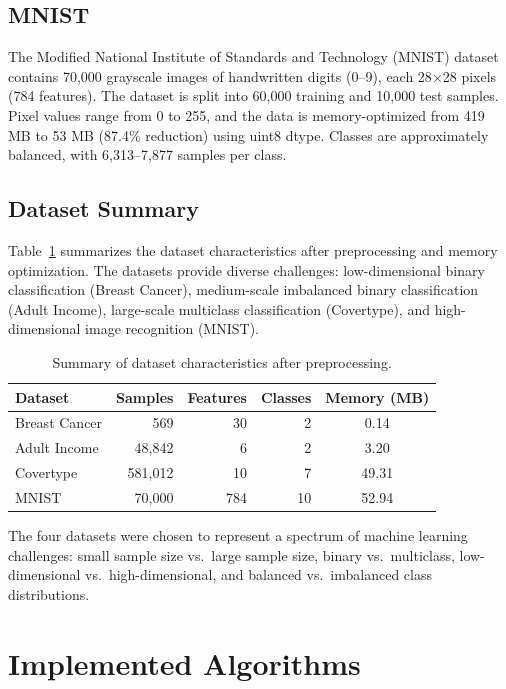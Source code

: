 \documentclass[conference,12pt]{IEEEtran}
\begin{document}
\subsection{MNIST}

The Modified National Institute of Standards and Technology (MNIST) dataset \cite{lecun1998mnist} contains 70,000 grayscale images of handwritten digits (0--9), each 28$\times$28 pixels (784 features). The dataset is split into 60,000 training and 10,000 test samples. Pixel values range from 0 to 255, and the data is memory-optimized from 419 MB to 53 MB (87.4\% reduction) using uint8 dtype. Classes are approximately balanced, with 6,313--7,877 samples per class.

\subsection{Dataset Summary}

Table~\ref{tab:datasets} summarizes the dataset characteristics after preprocessing and memory optimization. The datasets provide diverse challenges: low-dimensional binary classification (Breast Cancer), medium-scale imbalanced binary classification (Adult Income), large-scale multiclass classification (Covertype), and high-dimensional image recognition (MNIST).

\begin{table}[h]
\centering
\caption{Summary of dataset characteristics after preprocessing.}
\label{tab:datasets}
\small
\begin{tabular}{lrrrc}
\toprule
Dataset & Samples & Features & Classes & Memory (MB) \\
\midrule
Breast Cancer & 569 & 30 & 2 & 0.14 \\
Adult Income & 48,842 & 6 & 2 & 3.20 \\
Covertype & 581,012 & 10 & 7 & 49.31 \\
MNIST & 70,000 & 784 & 10 & 52.94 \\
\bottomrule
\end{tabular}
\end{table}

The four datasets were chosen to represent a spectrum of machine learning challenges: small sample size vs.\ large sample size, binary vs.\ multiclass, low-dimensional vs.\ high-dimensional, and balanced vs.\ imbalanced class distributions.

\section{Implemented Algorithms}
\end{document}
